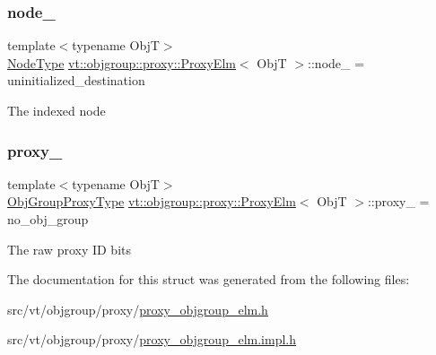 \subsubsection{\texorpdfstring{node\+\_\+}{node\_}}
{\footnotesize\ttfamily template$<$typename ObjT$>$ \\
\hyperlink{namespacevt_a866da9d0efc19c0a1ce79e9e492f47e2}{Node\+Type} \hyperlink{structvt_1_1objgroup_1_1proxy_1_1_proxy_elm}{vt\+::objgroup\+::proxy\+::\+Proxy\+Elm}$<$ ObjT $>$\+::node\+\_\+ = uninitialized\+\_\+destination\hspace{0.3cm}{\ttfamily [private]}}

The indexed node \mbox{\label{structvt_1_1objgroup_1_1proxy_1_1_proxy_elm_ab8a57044d257ea520a080de9f3389ba5}} 
\subsubsection{\texorpdfstring{proxy\+\_\+}{proxy\_}}
{\footnotesize\ttfamily template$<$typename ObjT$>$ \\
\hyperlink{namespacevt_ad7cae989df485fccca57f0792a880a8e}{Obj\+Group\+Proxy\+Type} \hyperlink{structvt_1_1objgroup_1_1proxy_1_1_proxy_elm}{vt\+::objgroup\+::proxy\+::\+Proxy\+Elm}$<$ ObjT $>$\+::proxy\+\_\+ = no\+\_\+obj\+\_\+group\hspace{0.3cm}{\ttfamily [private]}}

The raw proxy ID bits 

The documentation for this struct was generated from the following files\+:\begin{DoxyCompactItemize}
\item 
src/vt/objgroup/proxy/\hyperlink{proxy__objgroup__elm_8h}{proxy\+\_\+objgroup\+\_\+elm.\+h}\item 
src/vt/objgroup/proxy/\hyperlink{proxy__objgroup__elm_8impl_8h}{proxy\+\_\+objgroup\+\_\+elm.\+impl.\+h}\end{DoxyCompactItemize}
